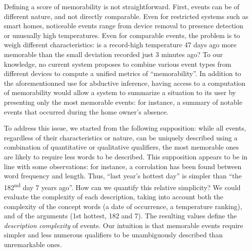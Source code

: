 \documentclass[entropy,article,submit,moreauthors,pdftex]{Definitions/mdpi}
\begin{document}
Defining a score of memorability is not straightforward. First, events can be of different nature, and not directly
comparable. Even for restricted systems such as smart homes, noticeable events
range from device removal to presence detection or unusually high
temperatures. Even for comparable events, the problem is to weigh different characteristics: is a record-high temperature 47 days
ago more memorable than the small deviation recorded just 3 minutes ago? To
our knowledge, no current system proposes to combine various
event types from different devices to compute a unified metrics of
``memorability''. 
In addition to the aforementionned use for abductive inference, having access to a computation of memorability would allow a system to summarize a situation to its user by presenting only the most memorable events: for instance, a summary of notable events that occurred during the home owner's absence.

To address this issue, we started from the following supposition: while all
events, regardless of their characteristics or nature, can be uniquely
described using a combination of quantitative or qualitative qualifiers, the most memorable ones are
likely to require less words to be described. This supposition appears to be in line with some observations: for instance, a corrolation has been found between word frequency and length\cite{strauss_word_2007}. Thus, ``last year's hottest day'' is simpler than ``the 182\textsuperscript{nd} day 7 years ago''. How can we quantify this relative simplicity? We could evaluate the complexity of each
description, taking into account both the complexity of the concept words (a date
of occurrence, a temperature ranking), and of the arguments (1st hottest,
182 and 7). The resulting values define the  \emph{description complexity}
of events. Our intuition is that memorable events require simpler and less numerous qualifiers to be
unambiguously described than unremarkable ones.
\end{document}
